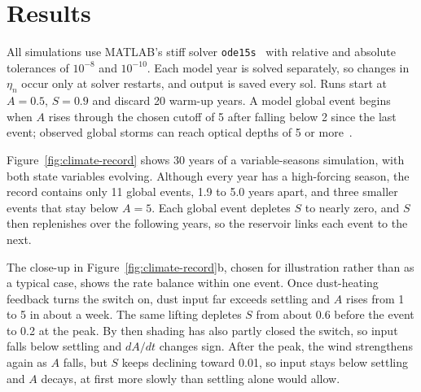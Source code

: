 \section{Results}
\label{sec:results}

\newcommand{\switchwidth}{0.6\linewidth}
\newcommand{\sweepwidth}{0.6\linewidth}

All simulations use MATLAB's stiff solver \texttt{ode15s}~\cite{shampine1997} with relative and absolute tolerances of $10^{-8}$ and $10^{-10}$. Each model year is solved separately, so changes in $\eta_n$ occur only at solver restarts, and output is saved every sol. Runs start at $A = 0.5$, $S = 0.9$ and discard 20 warm-up years. A model global event begins when $A$ rises through the chosen cutoff of 5 after falling below 2 since the last event; observed global storms can reach optical depths of 5 or more~\cite{smith2019}.

Figure~\ref{fig:climate-record} shows 30 years of a variable-seasons simulation, with both state variables evolving. Although every year has a high-forcing season, the record contains only 11 global events, 1.9 to 5.0 years apart, and three smaller events that stay below $A = 5$. Each global event depletes $S$ to nearly zero, and $S$ then replenishes over the following years, so the reservoir links each event to the next.

The close-up in Figure~\ref{fig:climate-record}b, chosen for illustration rather than as a typical case, shows the rate balance within one event. Once dust-heating feedback turns the switch on, dust input far exceeds settling and $A$ rises from 1 to 5 in about a week. The same lifting depletes $S$ from about 0.6 before the event to 0.2 at the peak. By then shading has also partly closed the switch, so input falls below settling and $dA/dt$ changes sign. After the peak, the wind strengthens again as $A$ falls, but $S$ keeps declining toward 0.01, so input stays below settling and $A$ decays, at first more slowly than settling alone would allow.

